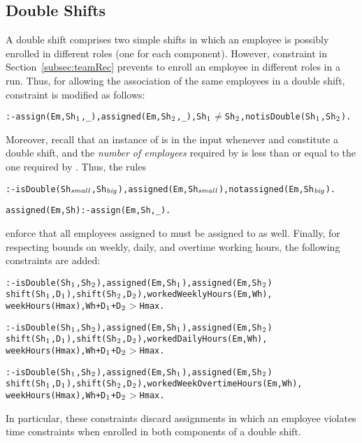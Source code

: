 \documentclass{tlp}
\begin{document}
\subsection{Double Shifts}\label{subsec:double}
A double shift comprises two simple shifts in which an employee is possibly enrolled in different roles (one for each component).
However, constraint \mytt{(*)} in Section~\ref{subsec:teamRec} prevents to enroll an employee in different roles in a run.
Thus, for allowing the association of the same employees in a double shift, constraint \mytt{(*)} is modified as follows:
\begin{alltt}\small
 :- assign(Em,Sh\(\sb{1}\),_), assigned(Em,Sh\(\sb{2}\),_), Sh\(\sb{1}\) \(\neq\) Sh\(\sb{2}\), not isDouble(Sh\(\sb{1}\),Sh\(\sb{2}\)).
\end{alltt}\normalsize
Moreover, recall that an instance of  
is in the input whenever  and  constitute a double shift, and
the {\em number of employees} required by  is less than or equal to the one
required by .
Thus, the rules
\begin{alltt}\small
 :- isDouble(Sh\(\sb{\mathit{small}}\),Sh\(\sb{\mathit{big}}\)), assigned(Em,Sh\(\sb{\mathit{small}}\)), not assigned(Em,Sh\(\sb{\mathit{big}}\)).

 assigned(Em,Sh) :- assign(Em,Sh,_).
\end{alltt}\normalsize
enforce that all employees assigned to 
must be assigned to  as well.
Finally, for respecting bounds on weekly, daily, and overtime working hours, the following constraints are added:
\begin{alltt}\small
 :- isDouble(Sh\(\sb{1}\),Sh\(\sb{2}\)), assigned(Em,Sh\(\sb{1}\)), assigned(Em,Sh\(\sb{2}\))
    shift(Sh\(\sb{1}\),D\(\sb{1}\)), shift(Sh\(\sb{2}\),D\(\sb{2}\)), workedWeeklyHours(Em,Wh),
    weekHours(Hmax), Wh + D\(\sb{1}\) + D\(\sb{2}\)  \(>\) Hmax.

 :- isDouble(Sh\(\sb{1}\),Sh\(\sb{2}\)), assigned(Em,Sh\(\sb{1}\)), assigned(Em,Sh\(\sb{2}\))
    shift(Sh\(\sb{1}\),D\(\sb{1}\)), shift(Sh\(\sb{2}\),D\(\sb{2}\)), workedDailyHours(Em,Wh),
    weekHours(Hmax), Wh + D\(\sb{1}\) + D\(\sb{2}\)  \(>\) Hmax.

 :- isDouble(Sh\(\sb{1}\),Sh\(\sb{2}\)), assigned(Em,Sh\(\sb{1}\)), assigned(Em,Sh\(\sb{2}\))
    shift(Sh\(\sb{1}\),D\(\sb{1}\)), shift(Sh\(\sb{2}\),D\(\sb{2}\)), workedWeekOvertimeHours(Em,Wh),
    weekHours(Hmax), Wh + D\(\sb{1}\) + D\(\sb{2}\)  \(>\) Hmax.
\end{alltt}\normalsize
In particular, these constraints discard assignments in which an employee violates time constraints when enrolled in both components of a double shift.
\end{document}
